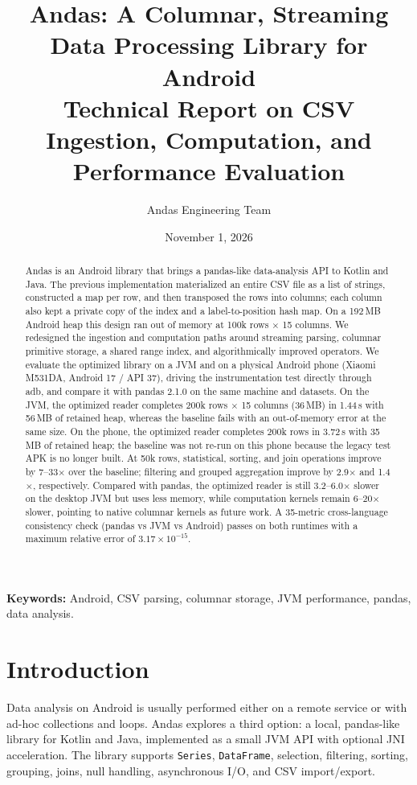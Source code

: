 \documentclass[11pt,a4paper]{article}
\title{\textbf{Andas: A Columnar, Streaming Data Processing Library for Android}\\[0.4em]
\large Technical Report on CSV Ingestion, Computation, and Performance Evaluation}
\author{Andas Engineering Team}
\date{November 1, 2026}
\newcommand{\code}[1]{\texttt{#1}}
\begin{document}
\maketitle

\begin{abstract}
Andas is an Android library that brings a pandas-like data-analysis API to Kotlin and Java.
The previous implementation materialized an entire CSV file as a list of strings, constructed
a map per row, and then transposed the rows into columns; each column also kept a private copy
of the index and a label-to-position hash map.  On a 192\,MB Android heap this design ran out of
memory at 100k rows $\times$ 15 columns.  We redesigned the ingestion and computation paths around
streaming parsing, columnar primitive storage, a shared range index, and algorithmically improved
operators.  We evaluate the optimized library on a JVM and on a physical Android phone (Xiaomi M531DA,
Android 17 / API 37), driving the instrumentation test directly through adb, and compare it with
pandas 2.1.0 on the same machine and datasets.  On the JVM, the optimized reader completes
200k rows $\times$ 15 columns (36\,MB) in 1.44\,s with 56\,MB of retained heap, whereas the baseline
fails with an out-of-memory error at the same size.  On the phone, the optimized reader completes
200k rows in 3.72\,s with 35\,MB of retained heap; the baseline was not re-run on this phone
because the legacy test APK is no longer built.  At 50k rows,
statistical, sorting, and join operations improve by 7--33$\times$ over the baseline; filtering and
grouped aggregation improve by 2.9$\times$ and 1.4$\times$, respectively.  Compared with pandas, the
optimized reader is still 3.2--6.0$\times$ slower on the desktop JVM but uses less memory, while
computation kernels remain 6--20$\times$ slower, pointing to native columnar kernels as future work.  A 35-metric cross-language consistency
check (pandas vs JVM vs Android) passes on both runtimes with a maximum relative error of
$3.17\times10^{-15}$.
\end{abstract}

\noindent\textbf{Keywords:} Android, CSV parsing, columnar storage, JVM performance, pandas, data analysis.

\section{Introduction}

Data analysis on Android is usually performed either on a remote service or with ad-hoc
collections and loops.  Andas explores a third option: a local, pandas-like library for Kotlin
and Java, implemented as a small JVM API with optional JNI acceleration.  The library supports
\code{Series}, \code{DataFrame}, selection, filtering, sorting, grouping, joins, null handling,
asynchronous I/O, and CSV import/export.
\end{document}
